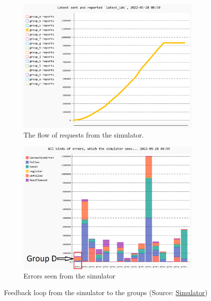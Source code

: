 \begin{figure}[h!]
  \centering
  \begin{subfigure}[b]{0.45\linewidth}
    \includegraphics[width=\linewidth]{images/introduction/latest_group_d.png}
    \caption{The flow of requests from the simulator.}
  \end{subfigure}
  \begin{subfigure}[b]{0.45\linewidth}
    \includegraphics[width=\linewidth]{images/introduction/errors_group_d.png}
    \caption{Errors seen from the simulator}
  \end{subfigure}
  \caption{Feedback loop from the simulator to the groups (Source: \href{http://164.92.246.227/status.html}{Simulator})}
  \label{fig:Simulator}
\end{figure}

